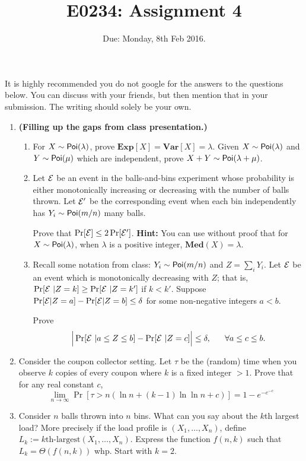 \documentclass[11pt]{article}
\def\Poi{{\sf Poi}}
\begin{document}
\title{E0234: Assignment 4}
\author{}
\date{Due: Monday, 8th Feb 2016.}
\maketitle
It is highly recommended you do not google for the answers to the questions below. You can discuss with your friends, but then mention that in your submission.
The writing should solely be your own.

\begin{enumerate}
\item  {\bf (Filling up the gaps from class presentation.)}
\begin{enumerate}
\item For $X \sim \Poi(\lambda)$, prove $\mathbf{Exp}[X] = \mathbf{Var}[X] = \lambda$. Given $X\sim\Poi(\lambda)$ and $Y\sim \Poi(\mu)$ which are independent, prove
$X+Y \sim \Poi(\lambda+\mu)$.

\item  Let ${\cal E}$ be an event in the balls-and-bins experiment whose probability is either monotonically increasing or decreasing with the number of balls thrown. 
Let ${\cal E}'$ be the corresponding event when each bin independently has $Y_i \sim \Poi(m/n)$ many balls.

Prove that $\Pr[{\cal E}] \leq 2\Pr[{\cal E}']$. {\bf Hint:} You can use without proof that for $X\sim \Poi(\lambda)$, when $\lambda$ is a positive integer, $\mathbf{Med}(X) = \lambda$.

\item Recall some notation from class: $Y_i \sim \Poi(m/n)$ and $Z = \sum_i Y_i$. Let ${\cal E}$ be an event which is monotonically decreasing with $Z$; that is, $\Pr[{\cal E}~|Z=k] \geq \Pr[{\cal E}~|Z=k']$ if $k < k'$. Suppose $\Pr[{\cal E}|Z=a] - \Pr[{\cal E}|Z=b] \leq \delta$ for some non-negative integers $a < b$. 

Prove
\[
\Big| \Pr[{\cal E}~|a \leq Z \leq b ]  - \Pr[{\cal E}~|Z = c] \Big| \leq \delta, ~~~~~\forall a\leq c\leq b.
\]
\end{enumerate}


\item Consider the coupon collector setting. Let $\tau$ be the (random) time when you observe $k$ copies of every coupon where $k$ is a fixed integer $> 1$.
Prove that for any real constant $c$,
\[\lim_{n\to \infty} \Pr[\tau > n\left(\ln n + (k-1)\ln\ln n + c\right)] = 1 - e^{-e^{-c}}\]

\item Consider $n$ balls thrown into $n$ bins. What can you say about the $k$th largest load?
More precisely if the load profile is $(X_1,\ldots,X_n)$, define
$L_k := \textrm{$k$th-largest}(X_1,\ldots,X_n).$
Express the function $f(n,k)$ such that $L_k = \Theta(f(n,k))$ whp. %
Start with $k=2$. 


\end{enumerate}
\end{document}
